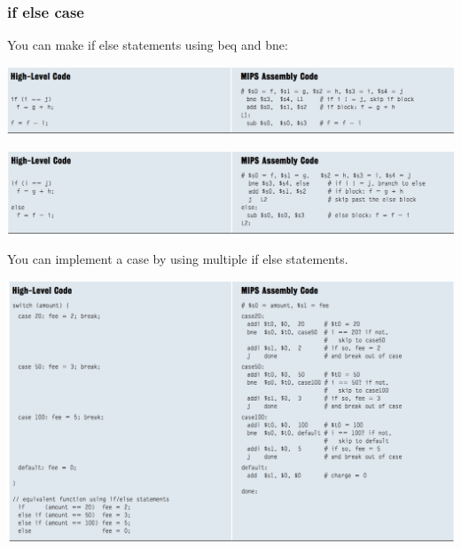 		\subsubsection{if else case}
		You can make if else statements using beq and bne:
		\begin{center}
				\includegraphics[width = 18cm]{images/if}
		\end{center}
		\begin{center}
				\includegraphics[width = 18cm]{images/else}
		\end{center}
		You can implement a case by using multiple if else statements.
		\begin{center}
				\includegraphics[width = 18cm]{images/case}
		\end{center}
